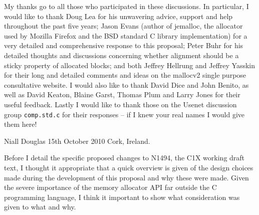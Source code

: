 \documentclass[wd]{isov2}
\begin{document}
{\begin{foreword}
My thanks go to all those who participated in these discussions. In particular, I would like to thank Doug Lea for his unwavering advice, support and help throughout the past five years; Jason Evans (author of jemalloc, the allocator used by Mozilla Firefox and the BSD standard C library implementation) for a very detailed and comprehensive response to this proposal; Peter Buhr for his detailed thoughts and discussions concerning whether alignment should be a sticky property of allocated blocks; and both Jeffrey Hellrung and Jeffrey Yasskin for their long and detailed comments and ideas on the mallocv2 single purpose consultative website. I would also like to thank David Dice and John Benito, as well as David Keaton, Blaine Garst, Thomas Plum and Larry Jones for their useful feedback. Lastly I would like to thank those on the Usenet discussion group \texttt{comp.std.c} for their responses -- if I knew your real names I would give them here!

\begin{flushleft}
Niall Douglas\linebreak
15th October 2010\linebreak
Cork, Ireland.
\end{flushleft}
\end{foreword}

\begin{introduction}
Before I detail the specific proposed changes to N1494, the C1X working draft text, I thought it appropriate that a quick overview is given of the design choices made during the development of this proposal and why these were made. Given the severe importance of the memory allocator API far outside the C programming language, I think it important to show what consideration was given to what and why.


\end{introduction}}
\end{document}
